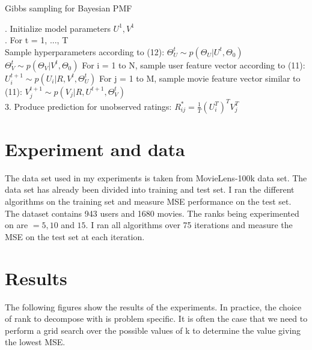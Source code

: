\documentclass[journal,onecolumn]{IEEEtran}
\begin{document}
\begin{algorithm}[H]
	\caption{Gibbs sampling for Bayesian PMF}
	\begin{algorithmic}
	. Initialize model parameters ${U^1, V^1}$ \\
	. For t = 1, ..., T \\
	\STATE \hspace{2em} Sample hyperparameters according to (12):
	\STATE \hspace{4em} $ \Theta_U^t \sim p(\Theta_U|U^t, \Theta_0) $
	\STATE \hspace{4em} $ \Theta_V^t \sim p(\Theta_V|V^t, \Theta_0) $
	\STATE \hspace{2em} For i = 1 to N, sample user feature vector according to (11):
	\STATE \hspace{4em} $ U_i^{t+1} \sim p(U_i | R, V^t, \Theta_U^t) $
	\STATE \hspace{2em} For j = 1 to M, sample movie feature vector similar to (11):
	\STATE \hspace{4em} $ V_j^{t+1} \sim p(V_j|R,U^{t+1},\Theta_V^t) $\\
	3. Produce prediction for unobserved ratings:
	\STATE \hspace{2em} $ R^*_{ij} = \frac{1}{T}(U^T_i)^TV^T_j $
	\end{algorithmic}
\end{algorithm}

\section{Experiment and data}

The data set used in my experiments is taken from MovieLens-100k data set. The data set has already been divided into training and test set. I ran the different algorithms on the training set and measure MSE performance on the test set. The dataset contains 943 users and 1680 movies. The ranks being experimented on are $ = 5, 10 $ and $ 15 $. I ran all algorithms over 75 iterations and measure the MSE on the test set at each iteration. 

\section{Results}
The following figures show the results of the experiments. In practice, the choice of rank to decompose with is problem specific. It is often the case that we need to perform a grid search over the possible values of k to determine the value giving the lowest MSE. 
\end{document}
